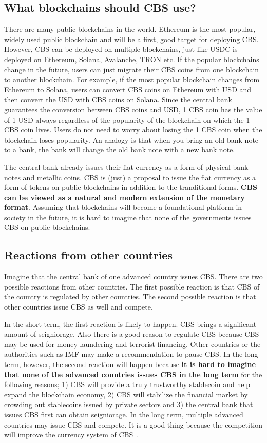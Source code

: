 \documentclass[dvipdfmx,a4paper]{article}
\begin{document}
\subsection{What blockchains should CBS use?}

There are many public blockchains in the world. Ethereum is the most popular, widely used public blockchain and will be a first, good target for deploying CBS. However, CBS can be deployed on multiple blockchains, just like USDC is deployed on Ethereum, Solana, Avalanche, TRON etc. If the popular blockchains change in the future, users can just migrate their CBS coins from one blockchain to another blockchain. For example, if the most popular blockchain changes from Ethereum to Solana, users can convert CBS coins on Ethereum with USD and then convert the USD with CBS coins on Solana. Since the central bank guarantees the conversion between CBS coins and USD, 1 CBS coin has the value of 1 USD always regardless of the popularity of the blockchain on which the 1 CBS coin lives. Users do not need to worry about losing the 1 CBS coin when the blockchain loses popularity. An analogy is that when you bring an old bank note to a bank, the bank will change the old bank note with a new bank note.

The central bank already issues their fiat currency as a form of physical bank notes and metallic coins. CBS is (just) a proposal to issue the fiat currency as a form of tokens on public blockchains in addition to the tranditional forms. \textbf{CBS can be viewed as a natural and modern extension of the monetary format}. Assuming that blockchains will become a foundational platform in society in the future, it is hard to imagine that none of the governments issues CBS on public blockchains.

\subsection{Reactions from other countries}

Imagine that the central bank of one advanced country issues CBS. There are two possible reactions from other countries. The first possible reaction is that CBS of the country is regulated by other countries. The second possible reaction is that other countries issue CBS as well and compete.

In the short term, the first reaction is likely to happen. CBS brings a significant amount of seigniorage. Also there is a good reason to regulate CBS because CBS may be used for money laundering and terrorist financing. Other countries or the authorities such as IMF may make a recommendation to pause CBS. In the long term, however, the second reaction will happen because \textbf{it is hard to imagine that none of the advanced countries issues CBS in the long term} for the following reasons; 1) CBS will provide a truly trustworthy stablecoin and help expand the blockchain economy, 2) CBS will stabilize the financial market by crowding out stablecoins issued by private sectors and 3) the central bank that issues CBS first can obtain seigniorage. In the long term, multiple advanced countries may issue CBS and compete. It is a good thing because the competition will improve the currency system of CBS~\cite{hayek2009denationalisation}.
\end{document}
